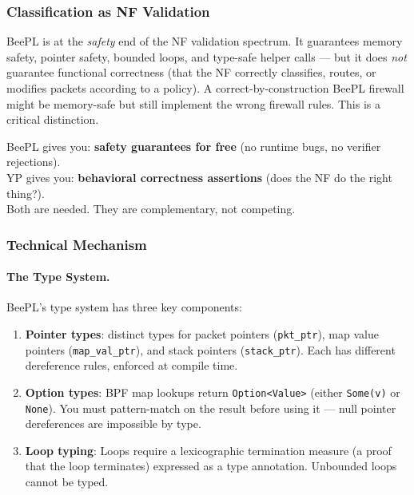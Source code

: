 \subsubsection{Classification as NF Validation}

BeePL is at the \emph{safety} end of the NF validation spectrum. It guarantees memory safety, pointer safety, bounded loops, and type-safe helper calls --- but it does \emph{not} guarantee functional correctness (that the NF correctly classifies, routes, or modifies packets according to a policy). A correct-by-construction BeePL firewall might be memory-safe but still implement the wrong firewall rules. This is a critical distinction.

\begin{insightbox}
BeePL gives you: \textbf{safety guarantees for free} (no runtime bugs, no verifier rejections). \\
YP gives you: \textbf{behavioral correctness assertions} (does the NF do the right thing?). \\
Both are needed. They are complementary, not competing.
\end{insightbox}

\subsubsection{Technical Mechanism}

\paragraph{The Type System.}
BeePL's type system has three key components:
\begin{enumerate}
  \item \textbf{Pointer types}: distinct types for packet pointers (\texttt{pkt\_ptr}), map value pointers (\texttt{map\_val\_ptr}), and stack pointers (\texttt{stack\_ptr}). Each has different dereference rules, enforced at compile time.
  \item \textbf{Option types}: BPF map lookups return \texttt{Option<Value>} (either \texttt{Some(v)} or \texttt{None}). You must pattern-match on the result before using it --- null pointer dereferences are impossible by type.
  \item \textbf{Loop typing}: Loops require a lexicographic termination measure (a proof that the loop terminates) expressed as a type annotation. Unbounded loops cannot be typed.
\end{enumerate}

